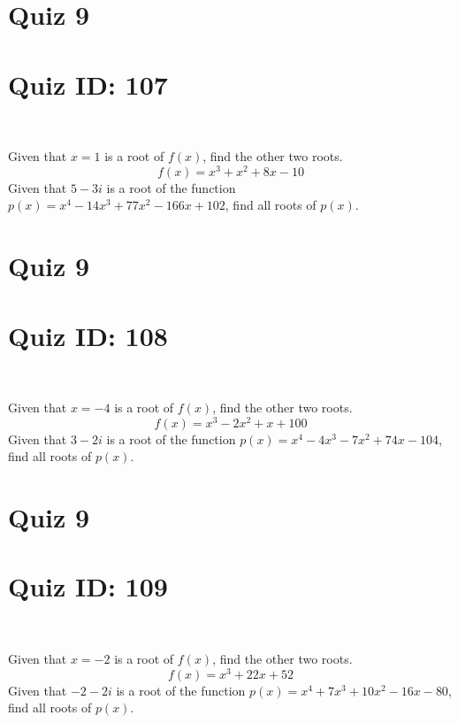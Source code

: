 \documentclass{exam}
\begin{document}
\section*{Quiz 9}
\section*{Quiz ID: 107}
\vspace{0.5cm}\
\vspace{1cm}\
\begin{questions}
\question Given that $x=1$ is a root of $f(x)$, find the other two roots.\[f(x)=
x^3 + x^2 + 8x - 10\]
\newpage
\question Given that $5-3\mathit{i}$ is a root of the function $p(x)=
x^4 - 14x^3 + 77x^2 - 166x + 102$, find all roots of $p(x)$. 
\end{questions}\newpage
\newpage
\section*{Quiz 9}
\section*{Quiz ID: 108}
\vspace{0.5cm}\
\vspace{1cm}\
\begin{questions}
\question Given that $x=-4$ is a root of $f(x)$, find the other two roots.\[f(x)=
x^3 - 2x^2 + x + 100\]
\newpage
\question Given that $3-2\mathit{i}$ is a root of the function $p(x)=
x^4 - 4x^3 - 7x^2 + 74x - 104$, find all roots of $p(x)$. \makeemptybox{\stretch{1}}
\end{questions}\newpage
\newpage
\section*{Quiz 9}
\section*{Quiz ID: 109}
\vspace{0.5cm}\
\vspace{1cm}\
\begin{questions}
\question Given that $x=-2$ is a root of $f(x)$, find the other two roots.\[f(x)=
x^3 + 22x + 52\]
\newpage
\question Given that $-2-2\mathit{i}$ is a root of the function $p(x)=
x^4 + 7x^3 + 10x^2 - 16x - 80$, find all roots of $p(x)$. \makeemptybox{\stretch{1}}
\end{questions}\newpage
\newpage
\end{document}
